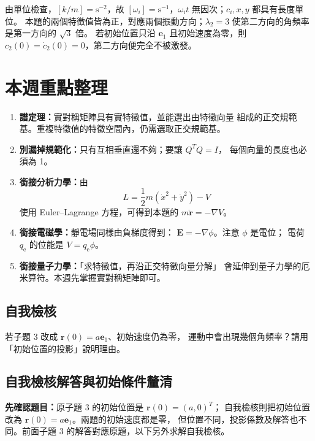 \documentclass[12pt,a4paper]{article}
\begin{document}
由單位檢查，\([k/m]=\mathrm{s^{-2}}\)，故 \([\omega_i]=\mathrm{s^{-1}}\)，\(\omega_it\) 無因次；\(c_i,x,y\) 都具有長度單位。
本題的兩個特徵值皆為正，對應兩個振動方向；\(\lambda_2=3\) 使第二方向的角頻率是第一方向的 \(\sqrt3\) 倍。
若初始位置只沿 \(\mathbf e_1\) 且初始速度為零，則 \(c_2(0)=\dot c_2(0)=0\)，第二方向便完全不被激發。

\section{本週重點整理}
\begin{enumerate}
    \item \textbf{譜定理：}實對稱矩陣具有實特徵值，並能選出由特徵向量
          組成的正交規範基。重複特徵值的特徵空間內，仍需選取正交規範基。
    \item \textbf{別漏掉規範化：}只有互相垂直還不夠；要讓 \(Q^TQ=I\)，
          每個向量的長度也必須為 1。
    \item \textbf{銜接分析力學：}由
          \[
              L=\frac12m(\dot x^2+\dot y^2)-V
          \]
          使用 Euler--Lagrange 方程，可得到本題的
          \(m\ddot{\mathbf r}=-\nabla V\)。
    \item \textbf{銜接電磁學：}靜電場同樣由負梯度得到：
          \(\mathbf E=-\nabla\phi\)。注意 \(\phi\) 是電位；
          電荷 \(q_{\mathrm e}\) 的位能是 \(V=q_{\mathrm e}\phi\)。
    \item \textbf{銜接量子力學：}「求特徵值，再沿正交特徵向量分解」
          會延伸到量子力學的厄米算符。本週先掌握實對稱矩陣即可。
\end{enumerate}

\subsection*{自我檢核}
若子題 3 改成 \(\mathbf r(0)=a\mathbf e_1\)、初始速度仍為零，
運動中會出現幾個角頻率？請用「初始位置的投影」說明理由。
\clearpage
\subsection*{自我檢核解答與初始條件釐清}
\textbf{先確認題目：}原子題 3 的初始位置是 \(\mathbf r(0)=(a,0)^T\)；
自我檢核則把初始位置改為 \(\mathbf r(0)=a\mathbf e_1\)。兩題的初始速度都是零，
但位置不同，投影係數及解答也不同。前面子題 3 的解答對應原題，以下另外求解自我檢核。
\end{document}
